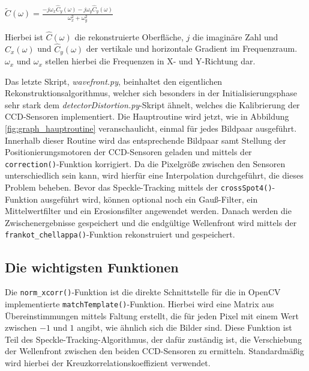 \begin{center}
	$ \tilde{C}\left(\omega\right) = \frac{-j\omega_x \hat{C}_y \left(\omega\right) - j\omega_y \hat{C}_y \left(\omega\right)}{\omega_x^2 + \omega_y^2}$
\end{center}

Hierbei ist $\hat{C}\left(\omega\right)$ die rekonstruierte Oberfläche, $j$ die imaginäre Zahl und $\hat{C}_x \left(\omega\right)$ und $\hat{C}_y \left(\omega\right)$ der vertikale und horizontale Gradient im Frequenzraum. $\omega_x$ und $\omega_x$ stellen hierbei die Frequenzen in X- und Y-Richtung dar. 

\begin{sloppypar}
	Das letzte Skript, \textit{wavefront.py}, beinhaltet den eigentlichen Rekonstruktionsalgorithmus, welcher sich besonders in der Initialisierungsphase sehr stark dem \textit{detectorDistortion.py}-Skript ähnelt, welches die Kalibrierung der \gls{CCD}-Sensoren implementiert. Die Hauptroutine wird jetzt, wie in Abbildung \ref{fig:graph_hauptroutine} veranschaulicht, einmal für jedes Bildpaar ausgeführt. Innerhalb dieser Routine wird das entsprechende Bildpaar samt Stellung der Positionierungsmotoren der \gls{CCD}-Sensoren geladen und mittels der \texttt{correction()}-Funktion korrigiert. Da die Pixelgröße zwischen den Sensoren unterschiedlich sein kann, wird hierfür eine Interpolation durchgeführt, die dieses Problem beheben. Bevor das Speckle-Tracking mittels der \texttt{crossSpot4()}-Funktion ausgeführt wird, können optional noch ein Gauß-Filter, ein Mittelwertfilter und ein Erosionsfilter angewendet werden. Danach werden die Zwischenergebnisse gespeichert und die endgültige Wellenfront wird mittels der \texttt{frankot\_chellappa()}-Funktion rekonstruiert und gespeichert. \cite{Coj17}
\end{sloppypar}

\subsection{Die wichtigsten Funktionen}

\begin{sloppypar}
	Die \texttt{norm\_xcorr()}-Funktion ist die direkte Schnittstelle für die in OpenCV implementierte \texttt{matchTemplate()}-Funktion. Hierbei wird eine Matrix aus Übereinstimmungen mittels Faltung erstellt, die für jeden Pixel mit einem Wert zwischen $-1$ und $1$ angibt, wie ähnlich sich die Bilder sind. Diese Funktion ist Teil des Speckle-Tracking-Algorithmus, der dafür zuständig ist, die Verschiebung der Wellenfront zwischen den beiden \gls{CCD}-Sensoren zu ermitteln. Standardmäßig wird hierbei der Kreuzkorrelationskoeffizient verwendet. 
\end{sloppypar}


